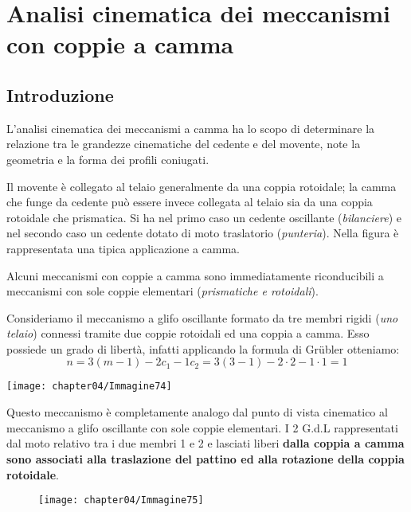 
	\chapter{Analisi cinematica dei meccanismi con coppie a camma}
	
		\section{Introduzione}
		
		\begin{minipage}{.7\textwidth}
		L'analisi cinematica dei meccanismi a camma ha lo scopo di determinare la relazione tra le grandezze cinematiche del cedente e del movente, note la geometria e la forma dei profili coniugati.
		
		Il movente è collegato al telaio generalmente da una coppia rotoidale; la camma che funge da cedente può essere invece collegata al telaio sia da una coppia rotoidale che prismatica. Si ha nel primo caso un cedente oscillante (\emph{bilanciere}) e nel secondo caso un cedente dotato di moto traslatorio (\emph{punteria}). Nella figura è rappresentata una tipica applicazione a camma.
		
		Alcuni meccanismi con coppie a camma sono immediatamente riconducibili a meccanismi con sole coppie elementari (\emph{prismatiche e rotoidali}).
		
		Consideriamo il meccanismo a glifo oscillante formato da tre membri rigidi (\emph{uno telaio}) connessi tramite due coppie rotoidali ed una coppia a camma. Esso possiede un grado di libertà, infatti applicando la formula di Grübler otteniamo:
		\[n = 3(m-1) - 2c_1 - 1c_2 = 3(3-1)-2\cdot2 -1\cdot1 = 1\]
		
		\end{minipage}
		\hfill
		\begin{minipage}{.25\textwidth}
		\centering
		\texttt{[image: chapter04/Immagine74]}	
		\end{minipage}
		\vspace{2mm}
		
		Questo meccanismo è completamente analogo dal punto di vista cinematico al meccanismo a glifo oscillante con sole coppie elementari. I 2 G.d.L rappresentati dal moto relativo tra i due membri 1 e 2 e lasciati liberi \textbf{dalla coppia a camma sono associati alla traslazione del pattino ed alla rotazione della coppia rotoidale}.
		
		\begin{figure}[!h]
		\centering
		\texttt{[image: chapter04/Immagine75]}
		\end{figure}
 
